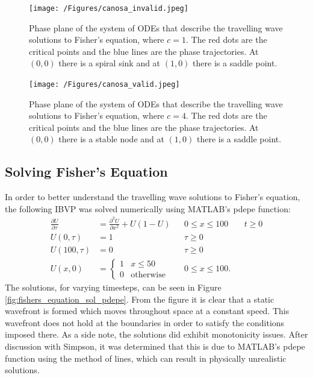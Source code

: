 \documentclass[11pt,titlepage,a4paper]{article}
\begin{document}
		\begin{figure}[tbh]
			\centering
				\texttt{[image: /Figures/canosa\_invalid.jpeg]}
			\caption{Phase plane of the system of ODEs that describe the travelling wave solutions to Fisher's equation, where $c = 1$. The red dots are the critical points and the blue lines are the phase trajectories. At $(0,0)$ there is a spiral sink and at $(1,0)$ there is a saddle point.}
			\label{fig:canosa_invalid}
		\end{figure}

		\begin{figure}[tbh]
			\centering
				\texttt{[image: /Figures/canosa\_valid.jpeg]}
			\caption{Phase plane of the system of ODEs that describe the travelling wave solutions to Fisher's equation, where $c = 4$. The red dots are the critical points and the blue lines are the phase trajectories. At $(0,0)$ there is a stable node and at $(1,0)$ there is a saddle point.}
			\label{fig:canosa_valid}
		\end{figure}


	\subsection{Solving Fisher's Equation}
		\label{sub:solvingfishersequation}

		In order to better understand the travelling wave solutions to Fisher's equation, the following IBVP was solved numerically using MATLAB's pdepe function:
		\begin{align*}
			 \label{eq:fisherNumericIBVP}
			 \frac{\partial U}{\partial \tau} &= \frac{\partial^2 U}{\partial x^2} + U(1 - U) && 0 \le x \le 100 && t \ge 0 \\
			 U(0, \tau) &= 1 && \tau \ge 0 \\
			 U(100, \tau) &= 0 && \tau \ge 0 \\
			 U(x, 0) &= 
			 \begin{cases}
   				1 & x \le 50 \\
   				0 & \text{otherwise}
  			\end{cases}
  			&& 0 \le x \le 100.
		\end{align*}
		The solutions, for varying timesteps, can be seen in Figure \ref{fig:fishers_equation_sol_pdepe}. From the figure it is clear that a static wavefront is formed which moves throughout space at a constant speed. This wavefront does not hold at the boundaries in order to satisfy the conditions imposed there. As a side note, the solutions did exhibit monotonicity issues. After discussion with Simpson, it was determined that this is due to MATLAB's pdepe function using the method of lines, which can result in physically unrealistic solutions.  
\end{document}
